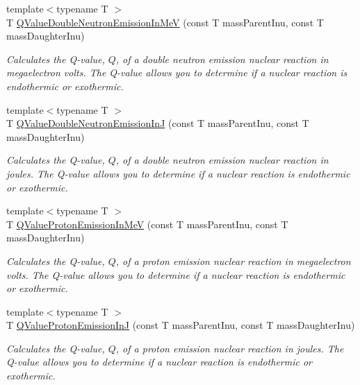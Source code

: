 \begin{DoxyCompactItemize}
{\footnotesize template$<$typename T $>$ }\\T \mbox{\hyperlink{group___e_g_x_phys-_q_value-_neutron_emission_gaeafae8a98e46b701517c1a2b8bfc241d}{Q\+Value\+Double\+Neutron\+Emission\+In\+MeV}} (const T mass\+Parent\+Inu, const T mass\+Daughter\+Inu)
\begin{DoxyCompactList}\small\item\em Calculates the Q-\/value, $Q$, of a double neutron emission nuclear reaction in megaelectron volts. The Q-\/value allows you to determine if a nuclear reaction is endothermic or exothermic. \end{DoxyCompactList}\item 
{\footnotesize template$<$typename T $>$ }\\T \mbox{\hyperlink{group___e_g_x_phys-_q_value-_neutron_emission_gae8a2c7bd5c4facaea7615eccdfc47be1}{Q\+Value\+Double\+Neutron\+Emission\+InJ}} (const T mass\+Parent\+Inu, const T mass\+Daughter\+Inu)
\begin{DoxyCompactList}\small\item\em Calculates the Q-\/value, $Q$, of a double neutron emission nuclear reaction in joules. The Q-\/value allows you to determine if a nuclear reaction is endothermic or exothermic. \end{DoxyCompactList}\item 
{\footnotesize template$<$typename T $>$ }\\T \mbox{\hyperlink{group___e_g_x_phys-_q_value-_proton_emission_ga5d92756e945e66bd2ed7d55145b95c3b}{Q\+Value\+Proton\+Emission\+In\+MeV}} (const T mass\+Parent\+Inu, const T mass\+Daughter\+Inu)
\begin{DoxyCompactList}\small\item\em Calculates the Q-\/value, $Q$, of a proton emission nuclear reaction in megaelectron volts. The Q-\/value allows you to determine if a nuclear reaction is endothermic or exothermic. \end{DoxyCompactList}\item 
{\footnotesize template$<$typename T $>$ }\\T \mbox{\hyperlink{group___e_g_x_phys-_q_value-_proton_emission_ga41f19b0d9a2dc06e89de44aaa2d48d62}{Q\+Value\+Proton\+Emission\+InJ}} (const T mass\+Parent\+Inu, const T mass\+Daughter\+Inu)
\begin{DoxyCompactList}\small\item\em Calculates the Q-\/value, $Q$, of a proton emission nuclear reaction in joules. The Q-\/value allows you to determine if a nuclear reaction is endothermic or exothermic. \end{DoxyCompactList}\item 

\end{DoxyCompactItemize}
